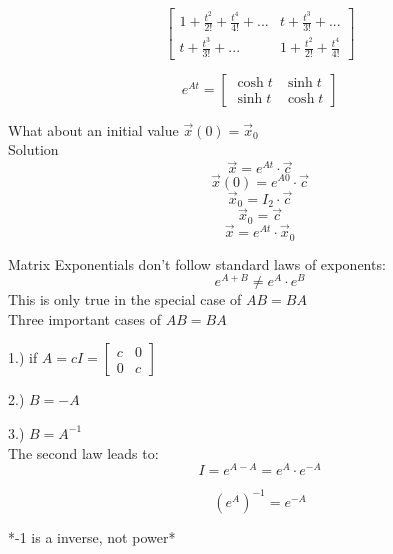 \documentclass[12pt]{article}
\numberwithin{equation}{subsection}
\newcommand{\indb}{\hspace{1cm}}
\newcommand{\indd}{\hspace{2cm}}
\begin{document}
$$ \begin{bmatrix}
1 + \frac{t^2}{2!} + \frac{t^4}{4!} +... & t+\frac{t^3}{3!} + ...\\
t+\frac{t^3}{3!} + ... & 1 + \frac{t^2}{2!} + \frac{t^4}{4!}
\end{bmatrix}$$


$$ e^{At} = \begin{bmatrix}
\cosh t & \sinh t \\
\sinh t & \cosh t
\end{bmatrix} $$
\newpage

What about an initial value $\vec{x}(0)=\vec{x}_0$\\

\indd Solution
\begin{equation}
\vec{x}= e^{At} \cdot \vec{c}
\end{equation}
\begin{equation}
\vec{x}(0)= e^{A0} \cdot \vec{c}
\end{equation}
\begin{equation}
\vec{x}_0= I_2  \cdot \vec{c}
\end{equation}
\begin{equation}
\vec{x}_0= \vec{c}
\end{equation}
\begin{equation}
\vec{x}= e^{At} \cdot \vec{x}_0
\end{equation}

Matrix Exponentials don't follow standard laws of exponents:
\begin{equation}
e^{A+B} \neq e^A \cdot e^B
\end{equation}
\indd This is only true in the special case of $AB=BA$\\

Three important cases of $AB = BA$

\indb 1.) if $A=cI=\begin{bmatrix}
c & 0 \\
0 & c
\end{bmatrix}$

\indb 2.) $B=-A$

\indb 3.) $B=A^{-1}$\\

The second law leads to:
\begin{equation}
I=e^{A-A}=e^A \cdot e^{-A}
\end{equation}

\begin{equation}
(e^A)^{-1}=e^{-A}
\end{equation}
\begin{center}
*-1 is a inverse, not power*\\
\end{center}
\end{document}
